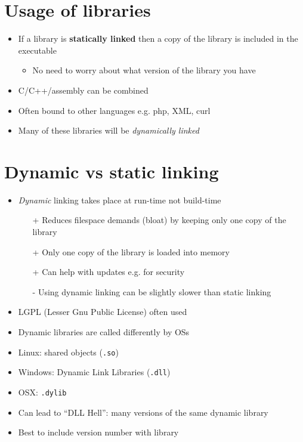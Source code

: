\documentclass{article}
\begin{document}
\section{Usage of libraries}
\begin{itemize}
\item If a library is \textbf{statically linked} then a copy of the library is included in the executable
\begin{itemize}
\item No need to worry about what version of the library you have
\end{itemize}
\item C/C++/assembly can be combined
\item Often bound to other languages e.g. php, XML, curl
\item Many of these libraries will be \emph{dynamically linked}
\end{itemize}



\section{Dynamic vs static linking}
\begin{itemize}
\item \emph{Dynamic} linking takes place at run-time not build-time
\begin{itemize}
\item [+] Reduces filespace demands (bloat) by keeping only one copy of the library
\item [+] Only one copy of the library is loaded into memory
\item [+] Can help with updates e.g. for security
\item [-] Using dynamic linking can be slightly slower than static linking
\end{itemize}
\item LGPL (Lesser Gnu Public License) often used
\item Dynamic libraries are called differently by OSs
\item Linux: shared objects (\verb!.so!)
\item Windows: Dynamic Link Libraries (\verb!.dll!)
\item OSX: \verb!.dylib!
\item Can lead to ``DLL Hell'': many versions of the same dynamic library
\item Best to include version number with library
\end{itemize}
\end{document}
